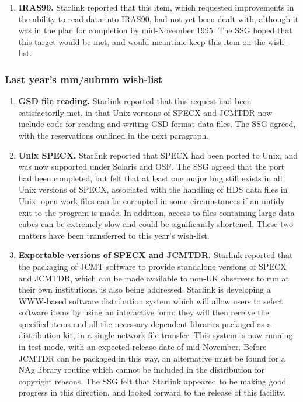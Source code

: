 \begin{enumerate}
\item {\bf IRAS90.} Starlink reported that this item, which requested
improvements in the ability to read data into IRAS90, had not yet been
dealt with, although it was in the plan for completion by mid-November
1995.  The SSG hoped that this target would be met, and would meantime
keep this item on the wish-list.

\end{enumerate}

\subsubsection{Last year's mm/submm wish-list}

\begin{enumerate}
\item {\bf GSD file reading.} Starlink reported that this request had been
satisfactorily met, in that Unix versions of SPECX and JCMTDR now
include code for reading and writing GSD format data files. The SSG
agreed, with the reservations outlined in the next paragraph.

\item {\bf Unix SPECX.} Starlink reported that SPECX had been ported to Unix,
and was now supported under Solaris and OSF. The SSG agreed that the
port had been completed, but felt that at least one major bug still
exists in all Unix versions of SPECX, associated with the handling of
HDS data files in Unix: open work files can be corrupted in some
circumstances if an untidy exit to the program is made. In addition,
access to files containing large data cubes can be extremely slow and
could be significantly shortened. These two matters have been
transferred to this year's wish-list.

\item {\bf Exportable versions of SPECX and JCMTDR.} Starlink reported that
the packaging of JCMT software to provide standalone versions of SPECX
and JCMTDR, which can be made available to non-UK observers to run at
their own institutions, is also being addressed. Starlink is
developing a WWW-based software distribution system which will allow
users to select software items by using an interactive form; they will
then receive the specified items and all the necessary dependent
libraries packaged as a distribution kit, in a single network file
transfer.  This system is now running in test mode, with an expected
release date of mid-November. Before JCMTDR can be packaged in this
way, an alternative must be found for a NAg library routine which
cannot be included in the distribution for copyright reasons. The SSG
felt that Starlink appeared to be making good progress in this
direction, and looked forward to the release of this facility.


\end{enumerate}
